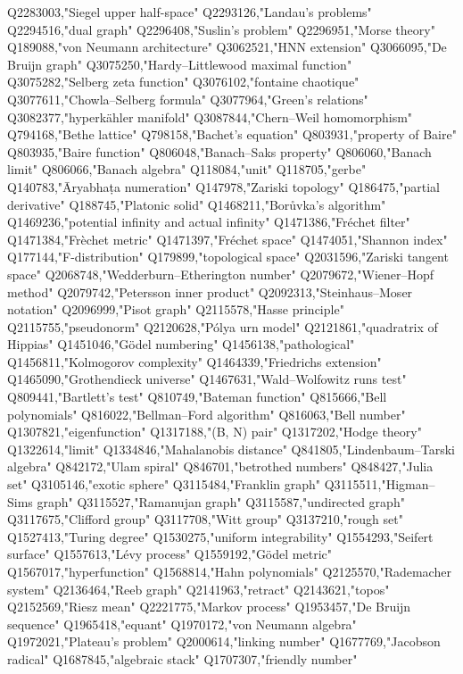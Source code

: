 Q2283003,"Siegel upper half-space"
Q2293126,"Landau's problems"
Q2294516,"dual graph"
Q2296408,"Suslin's problem"
Q2296951,"Morse theory"
Q189088,"von Neumann architecture"
Q3062521,"HNN extension"
Q3066095,"De Bruijn graph"
Q3075250,"Hardy–Littlewood maximal function"
Q3075282,"Selberg zeta function"
Q3076102,"fontaine chaotique"
Q3077611,"Chowla–Selberg formula"
Q3077964,"Green's relations"
Q3082377,"hyperkähler manifold"
Q3087844,"Chern–Weil homomorphism"
Q794168,"Bethe lattice"
Q798158,"Bachet's equation"
Q803931,"property of Baire"
Q803935,"Baire function"
Q806048,"Banach–Saks property"
Q806060,"Banach limit"
Q806066,"Banach algebra"
Q118084,"unit"
Q118705,"gerbe"
Q140783,"Āryabhaṭa numeration"
Q147978,"Zariski topology"
Q186475,"partial derivative"
Q188745,"Platonic solid"
Q1468211,"Borůvka's algorithm"
Q1469236,"potential infinity and actual infinity"
Q1471386,"Fréchet filter"
Q1471384,"Frèchet metric"
Q1471397,"Fréchet space"
Q1474051,"Shannon index"
Q177144,"F-distribution"
Q179899,"topological space"
Q2031596,"Zariski tangent space"
Q2068748,"Wedderburn–Etherington number"
Q2079672,"Wiener–Hopf method"
Q2079742,"Petersson inner product"
Q2092313,"Steinhaus–Moser notation"
Q2096999,"Pisot graph"
Q2115578,"Hasse principle"
Q2115755,"pseudonorm"
Q2120628,"Pólya urn model"
Q2121861,"quadratrix of Hippias"
Q1451046,"Gödel numbering"
Q1456138,"pathological"
Q1456811,"Kolmogorov complexity"
Q1464339,"Friedrichs extension"
Q1465090,"Grothendieck universe"
Q1467631,"Wald–Wolfowitz runs test"
Q809441,"Bartlett's test"
Q810749,"Bateman function"
Q815666,"Bell polynomials"
Q816022,"Bellman–Ford algorithm"
Q816063,"Bell number"
Q1307821,"eigenfunction"
Q1317188,"(B, N) pair"
Q1317202,"Hodge theory"
Q1322614,"limit"
Q1334846,"Mahalanobis distance"
Q841805,"Lindenbaum–Tarski algebra"
Q842172,"Ulam spiral"
Q846701,"betrothed numbers"
Q848427,"Julia set"
Q3105146,"exotic sphere"
Q3115484,"Franklin graph"
Q3115511,"Higman–Sims graph"
Q3115527,"Ramanujan graph"
Q3115587,"undirected graph"
Q3117675,"Clifford group"
Q3117708,"Witt group"
Q3137210,"rough set"
Q1527413,"Turing degree"
Q1530275,"uniform integrability"
Q1554293,"Seifert surface"
Q1557613,"Lévy process"
Q1559192,"Gödel metric"
Q1567017,"hyperfunction"
Q1568814,"Hahn polynomials"
Q2125570,"Rademacher system"
Q2136464,"Reeb graph"
Q2141963,"retract"
Q2143621,"topos"
Q2152569,"Riesz mean"
Q2221775,"Markov process"
Q1953457,"De Bruijn sequence"
Q1965418,"equant"
Q1970172,"von Neumann algebra"
Q1972021,"Plateau's problem"
Q2000614,"linking number"
Q1677769,"Jacobson radical"
Q1687845,"algebraic stack"
Q1707307,"friendly number"
